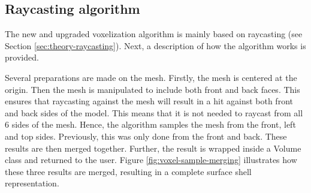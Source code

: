 \subsection{Raycasting algorithm}
\label{sec:method-raycasting-algorithm}
The new and upgraded voxelization algorithm is mainly based on raycasting (see Section \ref{sec:theory-raycasting}). Next, a description of how the algorithm works is provided.

Several preparations are made on the mesh. Firstly, the mesh is centered at the origin. Then the mesh is manipulated to include both front and back faces. This ensures that raycasting against the mesh will result in a hit against both front and back sides of the model. This means that it is not needed to raycast from all 6 sides of the mesh. Hence, the algorithm samples the mesh from the front, left and top sides. Previously, this was only done from the front and back. These results are then merged together. Further, the result is wrapped inside a Volume class and returned to the user. Figure \ref{fig:voxel-sample-merging} illustrates how these three results are merged, resulting in a complete surface shell representation.
